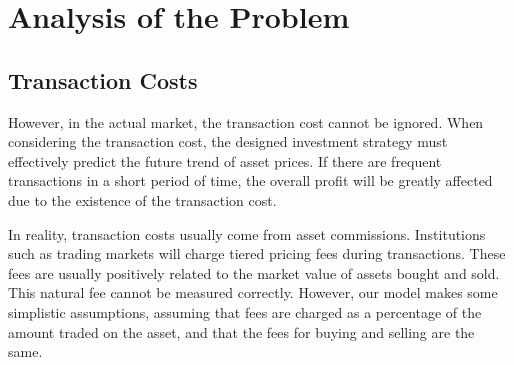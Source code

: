 \documentclass{mcmthesis}
\begin{document}



\section{Analysis of the Problem}

\subsection{Transaction Costs}


However, in the actual market, the transaction cost cannot be ignored. When considering the transaction cost, the designed investment strategy must effectively predict the future trend of asset prices. If there are frequent transactions in a short period of time, the overall profit will be greatly affected due to the existence of the transaction cost.


In reality, transaction costs usually come from asset commissions. Institutions such as trading markets will charge tiered pricing fees during transactions. These fees are usually positively related to the market value of assets bought and sold. This natural fee cannot be measured correctly. However, our model makes some simplistic assumptions, assuming that fees are charged as a percentage of the amount traded on the asset, and that the fees for buying and selling are the same.
\end{document}
